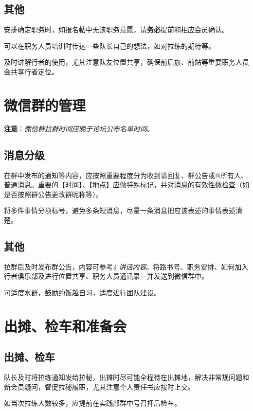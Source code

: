 \documentclass[UTF8]{ctexart}
\begin{document}
\subsection{其他}

安排确定职务时，如报名帖中无该职务意愿，请\textbf{务必}提前和相应会员确认。

可以在职务人员培训时传达一些队长自己的想法，如对拉练的期待等。

及时讲解行者的使用，尤其注意队友位置共享，确保前后旗、前站等重要职务人员会共享行者定位。

\section{微信群的管理}
\textbf{注意}：\textit{微信群拉群时间应晚于论坛公布名单时间。}

\subsection{消息分级}

在群中发布的通知等内容，应按照重要程度分为收到请回复、群公告或@所有人、普通消息。重要的【时间】、【地点】应做特殊标记，并对消息的有效性做检查（如是否按照群公告更改群昵称等）。

将多件事情分项标号，避免多条短消息，尽量一条消息把应该表述的事情表述清楚。

\subsection{其他}

拉群后及时发布群公告，内容可参考{\color{blue}\textit{4 讲话内容}}。将路书号、职务安排、如何加入行者俱乐部及进行位置共享、职务人员通讯录一并发送到微信群中。

可适度水群，鼓励约饭越自习，适度进行团队建设。

\section{出摊、检车和准备会}

\subsection{出摊、检车}

队长及时将拉练通知发给拉秘，出摊时尽可能全程待在出摊地，解决非常规问题和新会员疑问，督促拉秘履职，尤其注意个人责任书应按时上交。

如当次拉练人数较多，应提前在实践部群中号召押后检车。
\end{document}
